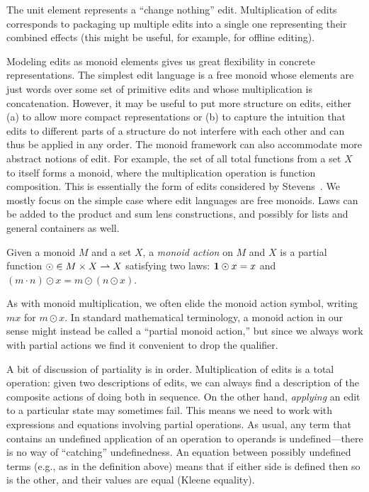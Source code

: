 The unit element represents a ``change nothing'' edit.  Multiplication of
edits corresponds to packaging up multiple edits into a single one
representing their combined effects\iffull{} (this might be useful, for example, for
offline editing)\fi.

Modeling edits as monoid elements gives us great flexibility in
concrete representations.
%
The simplest edit language is a {free monoid} whose elements are just words
over some set of primitive edits and whose multiplication is
concatenation.
%
However, it may be useful to put
more structure on edits, either (a) to allow
more compact representations or (b) to capture the intuition that edits to
different parts of a structure do not interfere with each other and can thus
be applied in any order.
%
The monoid framework can also accommodate more abstract notions of edit.  For
example, the set of all total functions from a set $X$ to itself forms a
monoid, where the multiplication operation is function composition.  This is
essentially the form of edits considered by
Stevens~\cite{stevens2008tat}\iflater{}\fi.  \iflater{}\fi
%
We mostly focus on the simple case where edit languages are free monoids.
Laws can be added to the product and sum lens constructions, and possibly
for lists and general containers as well.

\begin{definition}
    Given a  monoid $M$ and a set $X$, a \emph{monoid action} on $M$ and $X$
    is a partial function $\odot \in M \times X \rightharpoonup X$ satisfying two laws:
\iffull
\else
$\mbox{\bf{1}} \odot x = x$ and $(m \cdot n) \odot x = m \odot (n \odot x)$.
\fi
\end{definition}
%
As with monoid multiplication, we often elide the monoid action symbol,
writing $mx$ for $m \odot x$.  In standard mathematical terminology, a
monoid action in our sense might instead be called a ``partial monoid
action,'' but since we always work with partial actions we find it
convenient to drop the qualifier.

A bit of discussion of partiality is in order.
Multiplication of edits is a total operation: given two descriptions of
edits, we can always find a description of the composite actions of doing
both in sequence.  On the other hand, {\em applying} an edit to a particular
state may sometimes fail.
%
This means we need to work with expressions and equations involving
partial operations. As usual, any term that contains an undefined
application of an operation to operands is undefined---there is no way of
``catching'' undefinedness. An equation between possibly undefined terms
(e.g., as in the definition above)
means that if either side is defined then so is the other, and their values
are equal (Kleene equality).

